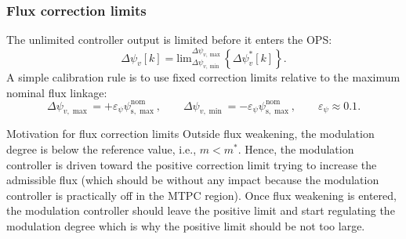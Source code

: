 \begin{frame}
    \frametitle{Flux correction limits}
    The unlimited controller output is limited before it enters the OPS:
    \begin{equation}
        \Delta\psi_v[k]
        = \mathrm{lim}_{\Delta\psi_{v,\min}}^{\Delta\psi_{v,\max}}\left\{\Delta\psi_v^{*}[k]\right\} .
    \end{equation}
    A simple calibration rule is to use fixed correction limits relative to the maximum nominal flux linkage:
    \begin{equation}
        \Delta\psi_{v,\max}=+\varepsilon_\psi\psi_{\mathrm{s},\max}^{\mathrm{nom}},
        \qquad
        \Delta\psi_{v,\min}=-\varepsilon_\psi\psi_{\mathrm{s},\max}^{\mathrm{nom}},
        \qquad
        \varepsilon_\psi \approx 0.1 .
    \end{equation}
    \begin{varblock}{Motivation for flux correction limits}
        Outside flux weakening, the modulation degree is below the reference value, i.e., $m < m^*$. Hence, the modulation controller is driven toward the positive correction limit trying to increase the admissible flux (which should be without any impact because the modulation controller is practically off in the MTPC region). Once flux weakening is entered, the modulation controller should leave the positive limit and start regulating the modulation degree which is why the positive limit should be not too large.
    \end{varblock}
\end{frame}


